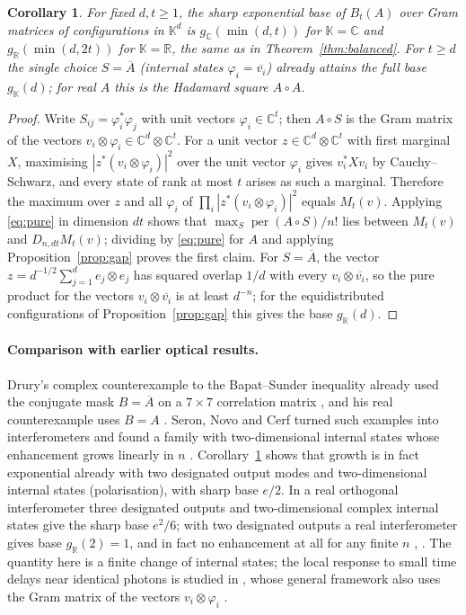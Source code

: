 \documentclass[11pt,a4paper]{article}
\newtheorem{corollary}[theorem]{Corollary}
\theoremstyle{remark}
\newcommand{\per}{\operatorname{per}}
\newcommand{\C}{\mathbb C}
\newcommand{\R}{\mathbb R}
\newcommand{\K}{\mathbb K}
\begin{document}
\begin{corollary}\label{cor:hadamard}
For fixed $d,t\ge1$, the sharp exponential base of $B_t(A)$ over Gram matrices of configurations in $\K^d$ is $g_\C(\min(d,t))$ for $\K=\C$ and $g_\R(\min(d,2t))$ for $\K=\R$, the same as in Theorem~\ref{thm:balanced}. For $t\ge d$ the single choice $S=\overline A$ (internal states $\varphi_i=\overline{v_i}$) already attains the full base $g_\K(d)$; for real $A$ this is the Hadamard square $A\circ A$.
\end{corollary}
\begin{proof}
Write $S_{ij}=\varphi_i^*\varphi_j$ with unit vectors $\varphi_i\in\C^t$; then $A\circ S$ is the Gram matrix of the vectors $v_i\otimes\varphi_i\in\C^d\otimes\C^t$. For a unit vector $z\in\C^d\otimes\C^t$ with first marginal $X$, maximising $|z^*(v_i\otimes\varphi_i)|^2$ over the unit vector $\varphi_i$ gives $v_i^*Xv_i$ by Cauchy--Schwarz, and every state of rank at most $t$ arises as such a marginal. Therefore the maximum over $z$ and all $\varphi_i$ of $\prod_i|z^*(v_i\otimes\varphi_i)|^2$ equals $M_t(v)$. Applying \eqref{eq:pure} in dimension $dt$ shows that $\max_S\per(A\circ S)/n!$ lies between $M_t(v)$ and $D_{n,dt}M_t(v)$; dividing by \eqref{eq:pure} for $A$ and applying Proposition~\ref{prop:gap} proves the first claim. For $S=\overline A$, the vector $z=d^{-1/2}\sum_{j=1}^de_j\otimes e_j$ has squared overlap $1/d$ with every $v_i\otimes\overline{v_i}$, so the pure product for the vectors $v_i\otimes\overline{v_i}$ is at least $d^{-n}$; for the equidistributed configurations of Proposition~\ref{prop:gap} this gives the base $g_\K(d)$.
\end{proof}

\paragraph{Comparison with earlier optical results.}
Drury's complex counterexample to the Bapat--Sunder inequality already used the conjugate mask $B=\overline A$ on a $7\times7$ correlation matrix \cite{Drury16}, and his real counterexample uses $B=A$ \cite{Drury17}. Seron, Novo and Cerf turned such examples into interferometers and found a family with two-dimensional internal states whose enhancement grows linearly in $n$ \cite{SNC}. Corollary~\ref{cor:hadamard} shows that growth is in fact exponential already with two designated output modes and two-dimensional internal states (polarisation), with sharp base $e/2$. In a real orthogonal interferometer three designated outputs and two-dimensional complex internal states give the sharp base $e^2/6$; with two designated outputs a real interferometer gives base $g_\R(2)=1$, and in fact no enhancement at all for any finite $n$ \cite{Liq}, \cite[Appendix~A]{EPBS}. The quantity here is a finite change of internal states; the local response to small time delays near identical photons is studied in \cite{PNC,PNC26}, whose general framework also uses the Gram matrix of the vectors $v_i\otimes\varphi_i$ \cite{PNC26}.
\end{document}
